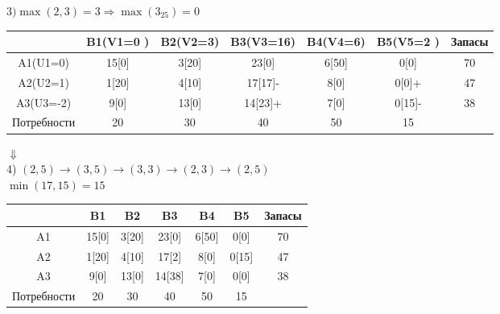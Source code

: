 \documentclass[a4paper, 12pt]{article}
\begin{document}
\begin{math}
  3) \max(2,3)= 3 \Rightarrow \max(3_{25}) = 0
\end{math}
\begin{table}[H]
\centering
\begin{tabular}{|c|c|c|c|c|c|c|}
\hline
            & B1(V1=0 )& B2(V2=3) & B3(V3=16) & B4(V4=6)  & B5(V5=2 ) & Запасы \\ \hline
A1(U1=0)    & 15[0]    & 3[20]    & 23[0]     & 6[50]     & 0[0]      & 70     \\ \hline
A2(U2=1)    & 1[20]    & 4[10]    & 17[17]-   & 8[0]      & 0[0]+     & 47     \\ \hline
A3(U3=-2)   & 9[0]     & 13[0]    & 14[23]+   & 7[0]      & 0[15]-    & 38     \\ \hline
Потребности & 20       & 30       & 40        & 50        & 15        &        \\ \hline
\end{tabular}
\end{table}

\begin{center}
  $\Downarrow$\\
  4) $(2,5)\rightarrow(3,5)\rightarrow(3,3)\rightarrow(2,3)\rightarrow(2,5)$\\
  $\min(17,15) = 15$
\end{center}
\begin{table}[H]
\centering
\begin{tabular}{|c|c|c|c|c|c|c|}
\hline
     & B1       & B2       & B3        & B4        & B5        & Запасы \\ \hline
A1   & 15[0]    & 3[20]    & 23[0]     & 6[50]     & 0[0]      & 70     \\ \hline
A2   & 1[20]    & 4[10]    & 17[2]     & 8[0]      & 0[15]     & 47     \\ \hline
A3   & 9[0]     & 13[0]    & 14[38]    & 7[0]      & 0[0]      & 38     \\ \hline
Потребности & 20       & 30       & 40        & 50        & 15        &        \\ \hline
\end{tabular}
\end{table}
\end{document}
